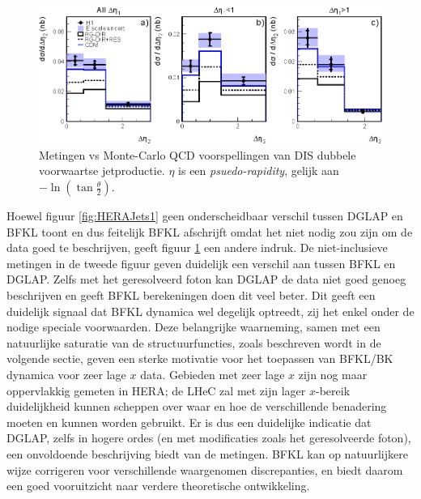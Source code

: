 \documentclass[a4paper,11pt]{article}
\numberwithin{equation}{section} %
\begin{document}
\begin{figure} [H]
  \begin{center}
    \includegraphics[scale=1]{Afbeeldingen/HERAJets2.eps}
    \caption{Metingen vs Monte-Carlo QCD voorspellingen van DIS dubbele voorwaartse jetproductie. $\eta$ is een \textit{psuedo-rapidity}, gelijk aan $-\ln{(\tan{\frac{\theta}{2}})}$. \cite{Kiesling}}
   \label{fig:HERAJets2}
  \end{center}
\end{figure}
Hoewel figuur \ref{fig:HERAJets1} geen onderscheidbaar verschil tussen DGLAP en BFKL toont en dus feitelijk BFKL afschrijft omdat het niet nodig zou zijn om de data goed te beschrijven, geeft figuur \ref{fig:HERAJets2} een andere indruk.
De niet-inclusieve metingen in de tweede figuur geven duidelijk een verschil aan tussen BFKL en DGLAP.
Zelfs met het geresolveerd foton kan DGLAP de data niet goed genoeg beschrijven en geeft BFKL berekeningen doen dit veel beter.
Dit geeft een duidelijk signaal dat BFKL dynamica wel degelijk optreedt, zij het enkel onder de nodige speciale voorwaarden.
Deze belangrijke waarneming, samen met een natuurlijke saturatie van de structuurfuncties, zoals beschreven wordt in de volgende sectie, geven een sterke motivatie voor het toepassen van BFKL/BK dynamica voor zeer lage $x$ data.
Gebieden met zeer lage $x$ zijn nog maar oppervlakkig gemeten in HERA; de LHeC zal met zijn lager $x$-bereik duidelijkheid kunnen scheppen over waar en hoe de verschillende benadering moeten en kunnen worden gebruikt.
Er is dus een duidelijke indicatie dat DGLAP, zelfs in hogere ordes (en met modificaties zoals het geresolveerde foton), een onvoldoende beschrijving biedt van de metingen.
BFKL kan op natuurlijkere wijze corrigeren voor verschillende waargenomen discrepanties, en biedt daarom een goed vooruitzicht naar verdere theoretische ontwikkeling.
\end{document}
